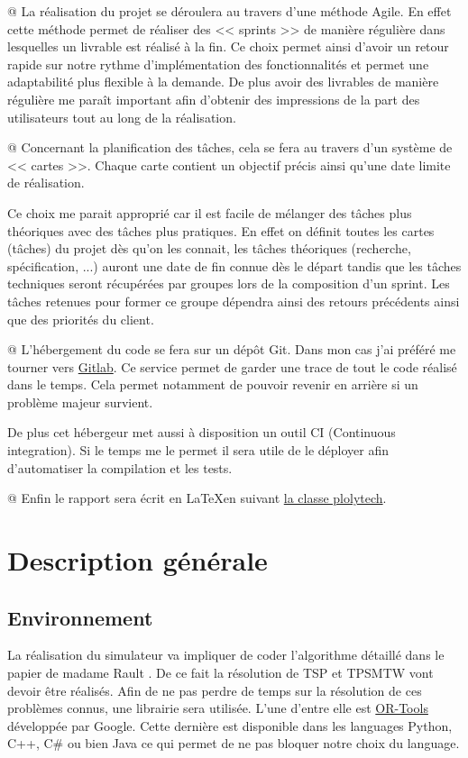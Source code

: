 \documentclass[noposter]{polytech}
\begin{document}
		\begin{easylist}
			@ La réalisation du projet se déroulera au travers d'une méthode Agile.
			En effet cette méthode permet de réaliser des << sprints >> de manière régulière dans lesquelles un livrable est réalisé à la fin.
			Ce choix permet ainsi d'avoir un retour rapide sur notre rythme d'implémentation des fonctionnalités et permet une adaptabilité plus flexible à la demande.
			De plus avoir des livrables de manière régulière me paraît important afin d'obtenir des impressions de la part des utilisateurs tout au long de la réalisation.
			
			@ Concernant la planification des tâches, cela se fera au travers d'un système de << cartes >>.
			Chaque carte contient un objectif précis ainsi qu'une date limite de réalisation.
			
			Ce choix me parait approprié car il est facile de mélanger des tâches plus théoriques avec des tâches plus pratiques.
			En effet on définit toutes les cartes (tâches) du projet dès qu'on les connait, les tâches théoriques (recherche, spécification, ...) auront une date de fin connue dès le départ tandis que les tâches techniques seront récupérées par groupes lors de la composition d'un sprint.
			Les tâches retenues pour former ce groupe dépendra ainsi des retours précédents ainsi que des priorités du client.
			
			@ L'hébergement du code se fera sur un dépôt Git.
			Dans mon cas j'ai préféré me tourner vers \href{https://gitlab.com}{Gitlab}.
			Ce service permet de garder une trace de tout le code réalisé dans le temps.
			Cela permet notamment de pouvoir revenir en arrière si un problème majeur survient.
			
			De plus cet hébergeur met aussi à disposition un outil CI (Continuous integration).
			Si le temps me le permet il sera utile de le déployer afin d'automatiser la compilation et les tests.
			
			@ Enfin le rapport sera écrit en \LaTeX en suivant \href{https://gitlab.projectsforge.org/polytech/polytech/}{la classe plolytech}.
		\end{easylist}
			
\chapter{Description générale}
	\section{Environnement}
		La réalisation du simulateur va impliquer de coder l'algorithme détaillé dans le papier de madame Rault \cite{Rault:chargers}.
		De ce fait la résolution de TSP et TPSMTW vont devoir être réalisés.
		Afin de ne pas perdre de temps sur la résolution de ces problèmes connus, une librairie sera utilisée.
		L'une d'entre elle est \href{https://developers.google.com/optimization/}{OR-Tools} développée par Google.
		Cette dernière est disponible dans les languages Python, C++, C\# ou bien Java ce qui permet de ne pas bloquer notre choix du language.
		
\end{document}
